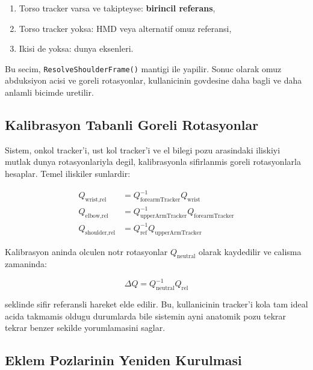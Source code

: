 \documentclass[11pt,a4paper]{article}
\begin{document}
\begin{enumerate}[nosep]
    \item Torso tracker varsa ve takipteyse: \textbf{birincil referans},
    \item Torso tracker yoksa: HMD veya alternatif omuz referansi,
    \item Ikisi de yoksa: dunya eksenleri.
\end{enumerate}

Bu secim, \texttt{ResolveShoulderFrame()} mantigi ile yapilir. Sonuc olarak
omuz abduksiyon acisi ve goreli rotasyonlar, kullanicinin govdesine daha bagli
ve daha anlamli bicimde uretilir.

\subsection{Kalibrasyon Tabanli Goreli Rotasyonlar}

Sistem, onkol tracker'i, ust kol tracker'i ve el bilegi pozu arasindaki iliskiyi
mutlak dunya rotasyonlariyla degil, kalibrasyonla sifirlanmis goreli rotasyonlarla
hesaplar. Temel iliskiler sunlardir:

\begin{align}
    Q_{\text{wrist,rel}} &= Q_{\text{forearmTracker}}^{-1} Q_{\text{wrist}}
    \label{eq:wrist_rel} \\
    Q_{\text{elbow,rel}} &= Q_{\text{upperArmTracker}}^{-1} Q_{\text{forearmTracker}}
    \label{eq:elbow_rel} \\
    Q_{\text{shoulder,rel}} &= Q_{\text{ref}}^{-1} Q_{\text{upperArmTracker}}
    \label{eq:shoulder_rel}
\end{align}

Kalibrasyon aninda olculen notr rotasyonlar $Q_{\text{neutral}}$ olarak
kaydedilir ve calisma zamaninda:

\begin{equation}
    \Delta Q = Q_{\text{neutral}}^{-1} Q_{\text{rel}}
    \label{eq:delta_q}
\end{equation}

seklinde sifir referansli hareket elde edilir. Bu, kullanicinin tracker'i kola
tam ideal acida takmamis oldugu durumlarda bile sistemin ayni anatomik pozu
tekrar tekrar benzer sekilde yorumlamasini saglar.

\subsection{Eklem Pozlarinin Yeniden Kurulmasi}
\end{document}
